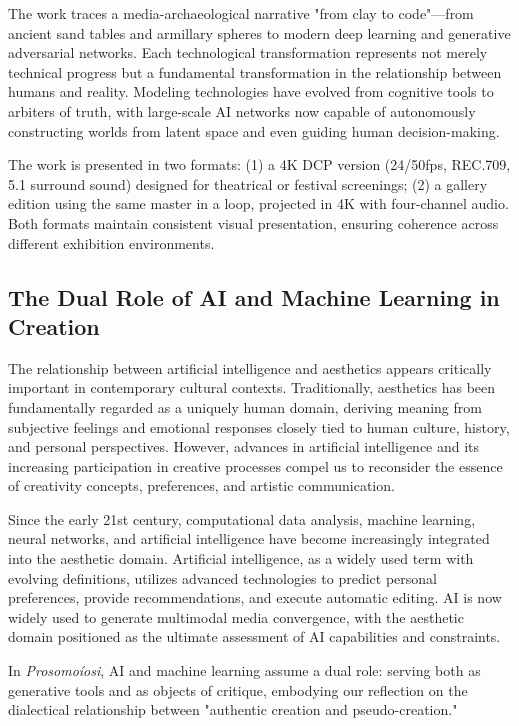 \documentclass{article}
\begin{document}
The work traces a media-archaeological narrative "from clay to code"—from ancient sand tables and armillary spheres to modern deep learning and generative adversarial networks. Each technological transformation represents not merely technical progress but a fundamental transformation in the relationship between humans and reality. Modeling technologies have evolved from cognitive tools to arbiters of truth, with large-scale AI networks now capable of autonomously constructing worlds from latent space and even guiding human decision-making.

The work is presented in two formats: (1) a 4K DCP version (24/50fps, REC.709, 5.1 surround sound) designed for theatrical or festival screenings; (2) a gallery edition using the same master in a loop, projected in 4K with four-channel audio. Both formats maintain consistent visual presentation, ensuring coherence across different exhibition environments.

\subsection{The Dual Role of AI and Machine Learning in Creation}

The relationship between artificial intelligence and aesthetics appears critically important in contemporary cultural contexts. Traditionally, aesthetics has been fundamentally regarded as a uniquely human domain, deriving meaning from subjective feelings and emotional responses closely tied to human culture, history, and personal perspectives. However, advances in artificial intelligence and its increasing participation in creative processes compel us to reconsider the essence of creativity concepts, preferences, and artistic communication.

Since the early 21st century, computational data analysis, machine learning, neural networks, and artificial intelligence have become increasingly integrated into the aesthetic domain. Artificial intelligence, as a widely used term with evolving definitions, utilizes advanced technologies to predict personal preferences, provide recommendations, and execute automatic editing. AI is now widely used to generate multimodal media convergence, with the aesthetic domain positioned as the ultimate assessment of AI capabilities and constraints.

In \textit{Prosomoíosi}, AI and machine learning assume a dual role: serving both as generative tools and as objects of critique, embodying our reflection on the dialectical relationship between "authentic creation and pseudo-creation."
\end{document}
